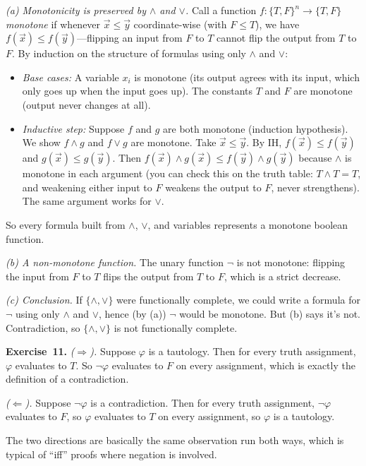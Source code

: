 \documentclass[11pt]{article}
\begin{document}
\emph{(a) Monotonicity is preserved by $\wedge$ and $\vee$.} Call a function $f : \{T, F\}^n \to \{T, F\}$ \emph{monotone} if whenever $\vec{x} \leq \vec{y}$ coordinate-wise (with $F \leq T$), we have $f(\vec{x}) \leq f(\vec{y})$---flipping an input from $F$ to $T$ cannot flip the output from $T$ to $F$. By induction on the structure of formulas using only $\wedge$ and $\vee$:
\begin{itemize}
  \item \emph{Base cases:} A variable $x_i$ is monotone (its output agrees with its input, which only goes up when the input goes up). The constants $T$ and $F$ are monotone (output never changes at all).
  \item \emph{Inductive step:} Suppose $f$ and $g$ are both monotone (induction hypothesis). We show $f \wedge g$ and $f \vee g$ are monotone. Take $\vec{x} \leq \vec{y}$. By IH, $f(\vec{x}) \leq f(\vec{y})$ and $g(\vec{x}) \leq g(\vec{y})$. Then $f(\vec{x}) \wedge g(\vec{x}) \leq f(\vec{y}) \wedge g(\vec{y})$ because $\wedge$ is monotone in each argument (you can check this on the truth table: $T \wedge T = T$, and weakening either input to $F$ weakens the output to $F$, never strengthens). The same argument works for $\vee$.
\end{itemize}
So every formula built from $\wedge$, $\vee$, and variables represents a monotone boolean function.

\emph{(b) A non-monotone function.} The unary function $\lnot$ is not monotone: flipping the input from $F$ to $T$ flips the output from $T$ to $F$, which is a strict decrease.

\emph{(c) Conclusion.} If $\{\wedge, \vee\}$ were functionally complete, we could write a formula for $\lnot$ using only $\wedge$ and $\vee$, hence (by (a)) $\lnot$ would be monotone. But (b) says it's not. Contradiction, so $\{\wedge, \vee\}$ is not functionally complete.

\medskip
\textbf{Exercise~11.}
\emph{($\Rightarrow$).} Suppose $\varphi$ is a tautology. Then for every truth assignment, $\varphi$ evaluates to $T$. So $\lnot \varphi$ evaluates to $F$ on every assignment, which is exactly the definition of a contradiction.

\emph{($\Leftarrow$).} Suppose $\lnot \varphi$ is a contradiction. Then for every truth assignment, $\lnot \varphi$ evaluates to $F$, so $\varphi$ evaluates to $T$ on every assignment, so $\varphi$ is a tautology.

The two directions are basically the same observation run both ways, which is typical of ``iff'' proofs where negation is involved.
\end{document}

